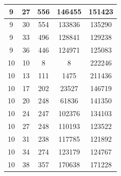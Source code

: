 \documentclass[a4paper,14pt]{extarticle}
\begin{document}
\begin{enumerate}[1.]
\begin{tabular}{|c|c|c|c|c|}
              9                                  & 27                                & 556                                     & 146455        & 151423 \\
              \hline
              9                                  & 30                                & 554                                     & 133836        & 135290 \\
              \hline
              9                                  & 33                                & 496                                     & 128841        & 129238 \\
              \hline
              9                                  & 36                                & 446                                     & 124971        & 125083 \\
              \hline
              10                                 & 10                                & 8                                       & 8             & 222246 \\
              \hline
              10                                 & 13                                & 111                                     & 1475          & 211436 \\
              \hline
              10                                 & 17                                & 202                                     & 23527         & 146719 \\
              \hline
              10                                 & 20                                & 248                                     & 61836         & 141350 \\
              \hline
              10                                 & 24                                & 247                                     & 102376        & 134103 \\
              \hline
              10                                 & 27                                & 248                                     & 110193        & 123522 \\
              \hline
              10                                 & 31                                & 238                                     & 117785        & 121892 \\
              \hline
              10                                 & 34                                & 274                                     & 123179        & 124767 \\
              \hline
              10                                 & 38                                & 357                                     & 170638        & 171228 \\

\end{tabular}
\end{enumerate}
\end{document}
